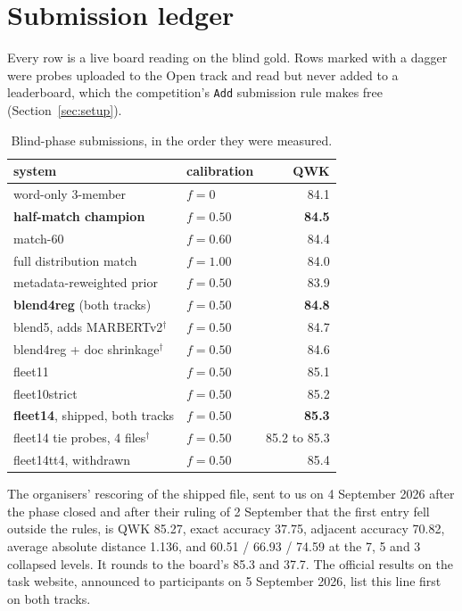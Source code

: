 \section{Submission ledger}
\label{app:ledger}

Every row is a live board reading on the blind gold. Rows marked with a dagger were probes
uploaded to the Open track and read but never added to a leaderboard, which the competition's
\texttt{Add} submission rule makes free (Section~\ref{sec:setup}).

\begin{table}[h]
\centering\small
\begin{tabular}{@{}llr@{}}
\toprule
system & calibration & QWK \\
\midrule
word-only 3-member & $f = 0$ & 84.1 \\
\textbf{half-match champion} & $f = 0.50$ & \textbf{84.5} \\
match-60 & $f = 0.60$ & 84.4 \\
full distribution match & $f = 1.00$ & 84.0 \\
metadata-reweighted prior & $f = 0.50$ & 83.9 \\
\textbf{blend4reg} (both tracks) & $f = 0.50$ & \textbf{84.8} \\
blend5, adds MARBERTv2$^\dagger$ & $f = 0.50$ & 84.7 \\
blend4reg + doc shrinkage$^\dagger$ & $f = 0.50$ & 84.6 \\
fleet11 & $f = 0.50$ & 85.1 \\
fleet10strict & $f = 0.50$ & 85.2 \\
\textbf{fleet14}, shipped, both tracks & $f = 0.50$ & \textbf{85.3} \\
fleet14 tie probes, 4 files$^\dagger$ & $f = 0.50$ & 85.2 to 85.3 \\
fleet14tt4, withdrawn & $f = 0.50$ & 85.4 \\
\bottomrule
\end{tabular}
\caption{Blind-phase submissions, in the order they were measured.}
\end{table}

The organisers' rescoring of the shipped file, sent to us on 4 September 2026 after the phase
closed and after their ruling of 2 September that the first entry fell outside the rules, is
QWK 85.27, exact accuracy 37.75, adjacent accuracy 70.82, average absolute distance 1.136,
and 60.51 / 66.93 / 74.59 at the 7, 5 and 3 collapsed levels. It rounds to the board's 85.3
and 37.7. The official results on the task website, announced to participants on 5 September
2026, list this line first on both tracks.

